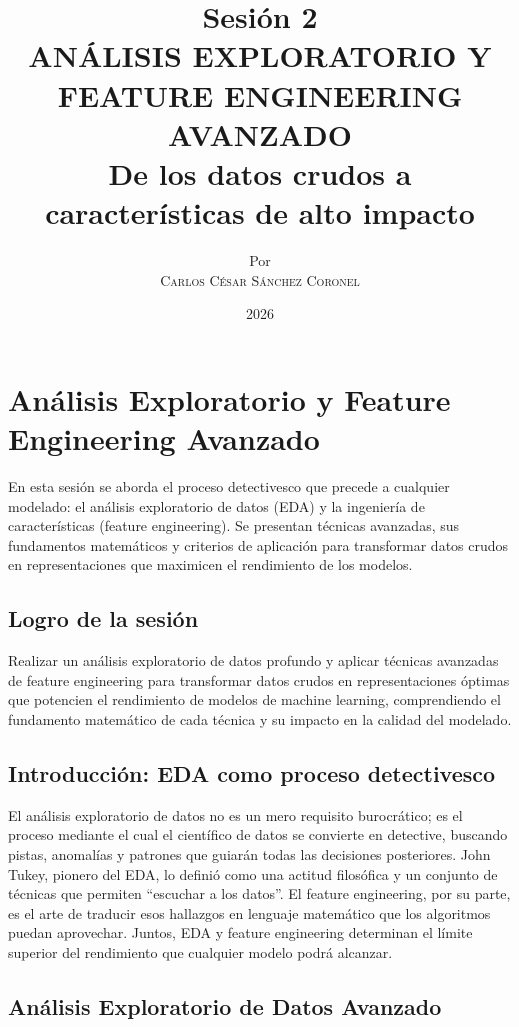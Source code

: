 \documentclass[12pt,a4paper,openany,oneside]{book}
\title{
    \textbf{Sesión 2} \\ 
    \Huge \textbf{ANÁLISIS EXPLORATORIO Y FEATURE ENGINEERING AVANZADO} \\
    \Large De los datos crudos a características de alto impacto
}
\author{
    \small Por \\ \vspace{0.2cm}
    \Large \textsc{Carlos César Sánchez Coronel}
}
\date{2026}
\begin{document}
\maketitle
\tableofcontents
{}

\chapter{Análisis Exploratorio y Feature Engineering Avanzado}

En esta sesión se aborda el proceso detectivesco que precede a cualquier modelado: el análisis exploratorio de datos (EDA) y la ingeniería de características (feature engineering). Se presentan técnicas avanzadas, sus fundamentos matemáticos y criterios de aplicación para transformar datos crudos en representaciones que maximicen el rendimiento de los modelos.

\section{Logro de la sesión}
Realizar un análisis exploratorio de datos profundo y aplicar técnicas avanzadas de feature engineering para transformar datos crudos en representaciones óptimas que potencien el rendimiento de modelos de machine learning, comprendiendo el fundamento matemático de cada técnica y su impacto en la calidad del modelado.

\section{Introducción: EDA como proceso detectivesco}
El análisis exploratorio de datos no es un mero requisito burocrático; es el proceso mediante el cual el científico de datos se convierte en detective, buscando pistas, anomalías y patrones que guiarán todas las decisiones posteriores. John Tukey, pionero del EDA, lo definió como una actitud filosófica y un conjunto de técnicas que permiten ``escuchar a los datos''. El feature engineering, por su parte, es el arte de traducir esos hallazgos en lenguaje matemático que los algoritmos puedan aprovechar. Juntos, EDA y feature engineering determinan el límite superior del rendimiento que cualquier modelo podrá alcanzar.

\section{Análisis Exploratorio de Datos Avanzado}
\end{document}
